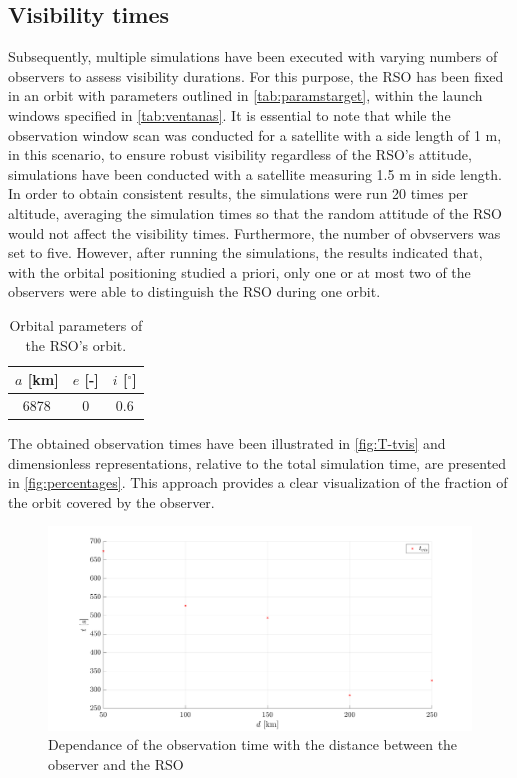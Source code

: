 \subsection{Visibility times}
Subsequently, multiple simulations have been executed with varying numbers of observers to assess visibility durations. For this purpose, the RSO has been fixed in an orbit with parameters outlined in \autoref{tab:paramstarget}, within the launch windows specified in \autoref{tab:ventanas}. It is essential to note that while the observation window scan was conducted for a satellite with a side length of 1 m, in this scenario, to ensure robust visibility regardless of the RSO's attitude, simulations have been conducted with a satellite measuring 1.5 m in side length. In order to obtain consistent results, the simulations were run 20 times per altitude, averaging the simulation times so that the random attitude of the RSO would not affect the visibility times. Furthermore, the number of obvservers was set to five. However, after running the simulations, the results indicated that, with the orbital positioning studied a priori, only one or at most two of the observers were able to distinguish the RSO during one orbit.

\begin{table}[H]
    \centering
    \caption{Orbital parameters of the RSO's orbit.}
    \begin{tabular}{ccc}
    \toprule
    \textbf{$a$ [km]} & \textbf{$e$ [-]} & \textbf{$i$ [$^\circ$]} \\
    \midrule
    6878 & 0 & 0.6 \\
    \bottomrule
    \end{tabular}
    \label{tab:paramstarget}
\end{table}

The obtained observation times have been illustrated in \autoref{fig:T-tvis} and dimensionless representations, relative to the total simulation time, are presented in \autoref{fig:percentages}. This approach provides a clear visualization of the fraction of the orbit covered by the observer.

\begin{figure}[H]
    \centering
    \includegraphics[width=\textwidth]{Figures/T-tvis.png}
    \caption{Dependance of the observation time with the distance between the observer and the RSO}
    \label{fig:T-tvis}
\end{figure}

